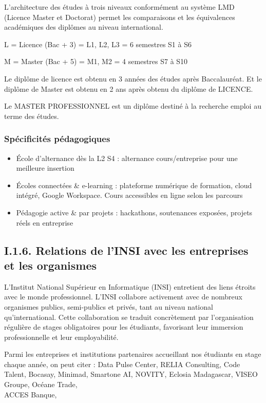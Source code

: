 {\small %


L'architecture des études à trois niveaux conformément au système LMD (Licence Master et Doctorat) permet les comparaisons et les équivalences académiques des diplômes au niveau international.

L = Licence (Bac + 3) = L1, L2, L3 = 6 semestres S1 à S6

M = Master (Bac + 5) = M1, M2 = 4 semestres S7 à S10

Le diplôme de licence est obtenu en 3 années des études après Baccalauréat. Et le diplôme de Master est obtenu en 2 ans après obtenu du diplôme de LICENCE.

Le MASTER PROFESSIONNEL est un diplôme destiné à la recherche emploi au terme des études.

\subsubsection*{Spécificités pédagogiques}

\begin{itemize}[noitemsep,nolistsep,left=0pt]
    \item École d'alternance dès la L2 S4 : alternance cours/entreprise pour une meilleure insertion
    \item Écoles connectées \& e-learning : plateforme numérique de formation, cloud intégré, Google Workspace. Cours accessibles en ligne selon les parcours
    \item Pédagogie active \& par projets : hackathons, soutenances exposées, projets réels en entreprise
\end{itemize}

\subsection{I.1.6. Relations de l'INSI avec les entreprises et les organismes}

L'Institut National Supérieur en Informatique (INSI) entretient des liens étroits avec le monde professionnel. L'INSI collabore activement avec de nombreux organismes publics, semi-publics et privés, tant au niveau national qu'international. Cette collaboration se traduit concrètement par l'organisation régulière de stages obligatoires pour les étudiants, favorisant leur immersion professionnelle et leur employabilité.

Parmi les entreprises et institutions partenaires accueillant nos étudiants en stage chaque année, on peut citer : Data Pulse Center, RELIA Consulting, Code Talent, Bocasay, Minimad, Smartone AI, NOVITY, Eclosia Madagascar, VISEO Groupe, Océane Trade,\\
ACCES Banque,

} %


